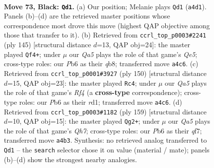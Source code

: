 \documentclass[11pt]{article}
\begin{document}
\clearpage

\begin{figure}[p]\centering
\begin{subfigure}{0.46\textwidth}\centering
\resizebox{\linewidth}{!}{%
\newchessgame
\chessboard[
  setfen={8/8/1p6/p7/q1P5/2K4k/8/8 b - - 3 73},
  showmover=false,
  pgfstyle=straightmove, color=movearrow, markmove={a4-d1}
]}
\caption{}
\end{subfigure}\hfill
\begin{subfigure}{0.46\textwidth}\centering
\resizebox{\linewidth}{!}{%
\newchessgame
\chessboard[
  setfen={1Q6/6k1/8/4p3/4q1P1/8/5K2/8 b - - 1 73},
  showmover=false,
  pgfstyle=straightmove, color=movearrow, markmove={e4-f4}
]}
\caption{}
\end{subfigure}
\\[4pt]
\begin{subfigure}{0.46\textwidth}\centering
\resizebox{\linewidth}{!}{%
\newchessgame
\chessboard[
  setfen={8/6k1/5p2/7P/5RP1/8/7K/3r4 w - - 11 76},
  showmover=false,
  pgfstyle=straightmove, color=movearrow, markmove={f4-c4}
]}
\caption{}
\end{subfigure}\hfill
\begin{subfigure}{0.46\textwidth}\centering
\resizebox{\linewidth}{!}{%
\newchessgame
\chessboard[
  setfen={8/5Q2/8/8/1k6/5KPp/7q/8 b - - 0 80},
  showmover=false,
  pgfstyle=straightmove, color=movearrow, markmove={h2-g2}
]}
\caption{}
\end{subfigure}
\caption{\textbf{Move 73, Black: \texttt{Qd1}.} (a) Our position; Melanie plays \texttt{Qd1} (\texttt{a4d1}). Panels (b)--(d) are the retrieved master positions whose correspondence most drove this move (highest QAP objective among those that transfer to it). (b) Retrieved from \texttt{ccrl\_top\_p0003\#2241} (ply 145) [structural distance $d$=13, QAP obj=24]: the master played \texttt{Qf4+}; under $\mu$ our \emph{Qa5} plays the role of that game's \emph{Qe5}; cross-type roles: our \emph{P}b6 as their \emph{q}b8; transferred move \texttt{a4c6}. (c) Retrieved from \texttt{ccrl\_top\_p0001\#3927} (ply 150) [structural distance $d$=15, QAP obj=23]: the master played \texttt{Rc4}; under $\mu$ our \emph{Qa5} plays the role of that game's \emph{Rf4} (a \textbf{cross-type} correspondence); cross-type roles: our \emph{P}b6 as their \emph{r}d1; transferred move \texttt{a4c6}. (d) Retrieved from \texttt{ccrl\_top\_p0003\#1182} (ply 159) [structural distance $d$=10, QAP obj=15]: the master played \texttt{Qg2+}; under $\mu$ our \emph{Qa5} plays the role of that game's \emph{Qh7}; cross-type roles: our \emph{P}b6 as their \emph{q}f7; transferred move \texttt{a4b3}. Synthesis: no retrieved analog transferred to \texttt{Qd1} -- the \texttt{search} selector chose it on value (material / mate); panels (b)--(d) show the strongest nearby analogies.}
\label{fig:thought-m145}
\end{figure}
\end{document}

